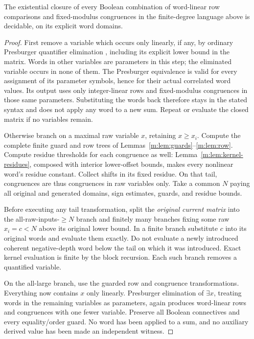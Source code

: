 \begin{theorem}\label{m:thm:existential}
The existential closure of every Boolean combination of word-linear row
comparisons and fixed-modulus congruences in the finite-degree language
above is decidable, on its explicit word domains.
\end{theorem}
\begin{proof}
First remove a variable which occurs only linearly, if any, by ordinary
Presburger quantifier elimination \cite{cooper}, including its explicit
lower bound in the matrix. Words in other variables are parameters
in this step; the eliminated variable occurs in none of them.  The
Presburger equivalence is valid for every assignment of its parameter
symbols, hence for their actual correlated word values.  Its output
uses only integer-linear rows and fixed-modulus congruences in those
same parameters.  Substituting the words back therefore stays in the
stated syntax and does not apply any word to a new sum. Repeat or
evaluate the closed matrix if no variables remain.

Otherwise branch on a maximal raw variable $x$, retaining $x\ge x_i$.
Compute the complete finite guard and row trees of
Lemmas~\ref{m:lem:guards}--\ref{m:lem:row}. Compute residue thresholds for each
congruence as well: Lemma~\ref{m:lem:kernel-residues}, composed with interior
lower-offset bounds, makes every nonlinear word's residue constant.
Collect shifts in its fixed residue. On that tail, congruences are thus
congruences in raw variables only. Take a common $N$ paying all original
and generated domains, sign estimates, guards, and residue bounds.

Before executing any tail transformation, split the \emph{original current
matrix} into the all-raw-inputs-$\ge N$ branch and finitely many branches
fixing some raw $x_i=c<N$ above its original lower bound. In a finite
branch substitute $c$ into its original words and evaluate them exactly.
Do not evaluate a newly introduced coherent negative-depth word below the
tail on which it was introduced. Exact kernel evaluation is finite by the
block recursion. Each such branch removes a quantified variable.

On the all-large branch, use the guarded row and congruence transformations.
Everything now contains $x$ only linearly. Presburger elimination of
$\exists x$, treating words in the remaining variables as parameters,
again produces word-linear rows and congruences with one fewer variable.
Preserve all Boolean connectives and every equality/order guard. No word
has been applied to a sum, and no auxiliary derived value has been made
an independent witness.


\end{proof}
